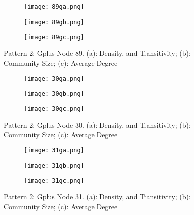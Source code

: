 \begin{figure}[h]
	\centering
	\begin{subfigure}{.5\textwidth}
		\centering
		\texttt{[image: 89ga.png]}
		\caption{}		
		\label{fig:89ga}
	\end{subfigure}%
	\begin{subfigure}{.5\textwidth}
		\centering
		\texttt{[image: 89gb.png]}
		\caption{}	
		\label{fig:89gb}
	\end{subfigure}
	\begin{subfigure}{.5\textwidth}
		\centering
		\texttt{[image: 89gc.png]}
		\caption{}	
		\label{fig:89gc}
	\end{subfigure}
	\caption{Pattern 2: Gplus Node 89. (a): Density, and Transitivity; (b): Community Size; (c): Average Degree}
	\label{fig:89g}
\end{figure}



\begin{figure}[h]
	\centering
	\begin{subfigure}{.5\textwidth}
		\centering
		\texttt{[image: 30ga.png]}
		\caption{}		
		\label{fig:30ga}
	\end{subfigure}%
	\begin{subfigure}{.5\textwidth}
		\centering
		\texttt{[image: 30gb.png]}
		\caption{}	
		\label{fig:30gb}
	\end{subfigure}
	\begin{subfigure}{.5\textwidth}
		\centering
		\texttt{[image: 30gc.png]}
		\caption{}	
		\label{fig:30gc}
	\end{subfigure}
	\caption{Pattern 2: Gplus Node 30. (a): Density, and Transitivity; (b): Community Size; (c): Average Degree}
	\label{fig:30g}
\end{figure}

\begin{figure}[h]
	\centering
	\begin{subfigure}{.5\textwidth}
		\centering
		\texttt{[image: 31ga.png]}
		\caption{}		
		\label{fig:31ga}
	\end{subfigure}%
	\begin{subfigure}{.5\textwidth}
		\centering
		\texttt{[image: 31gb.png]}
		\caption{}	
		\label{fig:31gb}
	\end{subfigure}
	\begin{subfigure}{.5\textwidth}
		\centering
		\texttt{[image: 31gc.png]}
		\caption{}	
		\label{fig:31gc}
	\end{subfigure}
	\caption{Pattern 2: Gplus Node 31. (a): Density, and Transitivity; (b): Community Size; (c): Average Degree}
	\label{fig:31g}
\end{figure}

